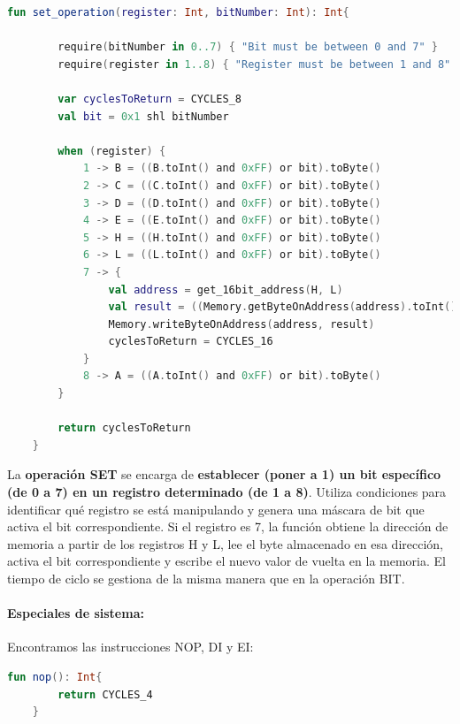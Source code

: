 \begin{lstlisting}[language=Kotlin, caption={Operación SET}, label={code:kotlinset}]
    fun set_operation(register: Int, bitNumber: Int): Int{

        require(bitNumber in 0..7) { "Bit must be between 0 and 7" }
        require(register in 1..8) { "Register must be between 1 and 8" }

        var cyclesToReturn = CYCLES_8
        val bit = 0x1 shl bitNumber

        when (register) {
            1 -> B = ((B.toInt() and 0xFF) or bit).toByte()
            2 -> C = ((C.toInt() and 0xFF) or bit).toByte()
            3 -> D = ((D.toInt() and 0xFF) or bit).toByte()
            4 -> E = ((E.toInt() and 0xFF) or bit).toByte()
            5 -> H = ((H.toInt() and 0xFF) or bit).toByte()
            6 -> L = ((L.toInt() and 0xFF) or bit).toByte()
            7 -> {
                val address = get_16bit_address(H, L)
                val result = ((Memory.getByteOnAddress(address).toInt() and 0xFF) or bit).toByte()
                Memory.writeByteOnAddress(address, result)
                cyclesToReturn = CYCLES_16
            }
            8 -> A = ((A.toInt() and 0xFF) or bit).toByte()
        }

        return cyclesToReturn
    }
\end{lstlisting}

La \textbf{operación SET} se encarga de \textbf{establecer (poner a 1) un bit específico (de 0 a 7) en un registro determinado (de 1 a 8)}. Utiliza condiciones para identificar qué registro se está manipulando y genera una máscara de bit que activa el bit correspondiente. Si el registro es 7, la función obtiene la dirección de memoria a partir de los registros H y L, lee el byte almacenado en esa dirección, activa el bit correspondiente y escribe el nuevo valor de vuelta en la memoria. El tiempo de ciclo se gestiona de la misma manera que en la operación BIT.

\paragraph{Especiales de sistema:} Encontramos las instrucciones NOP, DI y EI:

\begin{lstlisting}[language=Kotlin, caption={Operación NOP}, label={code:kotlinnop}]
    fun nop(): Int{
        return CYCLES_4
    }
\end{lstlisting}

